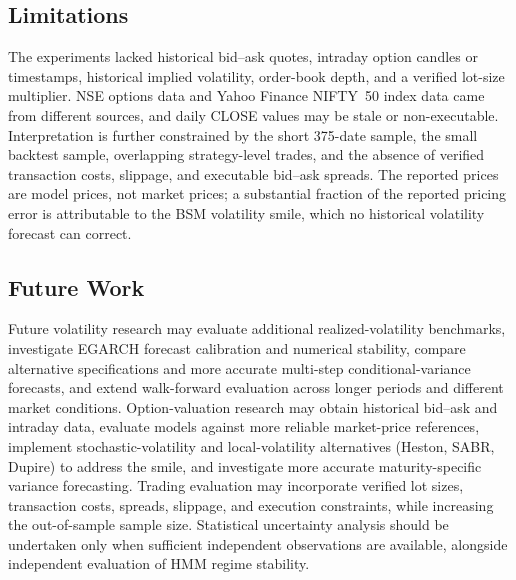 \documentclass[journal]{IEEEtran}
\begin{document}
\subsection*{Limitations}

The experiments lacked historical bid--ask quotes, intraday option candles or timestamps, historical implied volatility, order-book depth, and a verified lot-size multiplier. NSE options data and Yahoo Finance NIFTY~50 index data came from different sources, and daily CLOSE values may be stale or non-executable. Interpretation is further constrained by the short 375-date sample, the small backtest sample, overlapping strategy-level trades, and the absence of verified transaction costs, slippage, and executable bid--ask spreads. The reported prices are model prices, not market prices; a substantial fraction of the reported pricing error is attributable to the BSM volatility smile, which no historical volatility forecast can correct.

\subsection*{Future Work}

Future volatility research may evaluate additional realized-volatility benchmarks, investigate EGARCH forecast calibration and numerical stability, compare alternative specifications and more accurate multi-step conditional-variance forecasts, and extend walk-forward evaluation across longer periods and different market conditions. Option-valuation research may obtain historical bid--ask and intraday data, evaluate models against more reliable market-price references, implement stochastic-volatility and local-volatility alternatives (Heston, SABR, Dupire) to address the smile, and investigate more accurate maturity-specific variance forecasting. Trading evaluation may incorporate verified lot sizes, transaction costs, spreads, slippage, and execution constraints, while increasing the out-of-sample sample size. Statistical uncertainty analysis should be undertaken only when sufficient independent observations are available, alongside independent evaluation of HMM regime stability.
\end{document}
